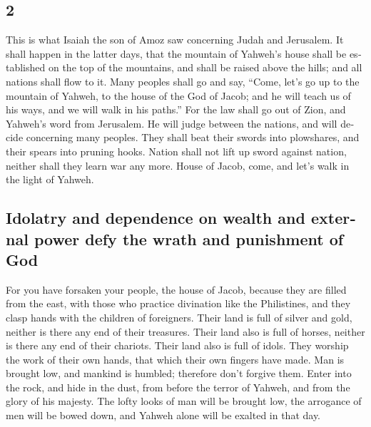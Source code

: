 \begin{paracol}{2}
\begin{otherlanguage}{english}
\hypertarget{section-3}{%
\section{2}\label{section-3}}

 This is what Isaiah the son of Amoz saw concerning Judah
and Jerusalem.  It shall happen in the latter days, that
the mountain of Yahweh's house shall be established on the top of the
mountains, and shall be raised above the hills; and all nations shall
flow to it.  Many peoples shall go and say, ``Come, let's
go up to the mountain of Yahweh, to the house of the God of Jacob; and
he will teach us of his ways, and we will walk in his paths.'' For the
law shall go out of Zion, and Yahweh's word from Jerusalem.
 He will judge between the nations, and will decide
concerning many peoples. They shall beat their swords into plowshares,
and their spears into pruning hooks. Nation shall not lift up sword
against nation, neither shall they learn war any more. 
House of Jacob, come, and let's walk in the light of Yahweh.

\hypertarget{idolatry-and-dependence-on-wealth-and-external-power-defy-the-wrath-and-punishment-of-god}{%
\subsection{Idolatry and dependence on wealth and external power defy
the wrath and punishment of
God}\label{idolatry-and-dependence-on-wealth-and-external-power-defy-the-wrath-and-punishment-of-god}}

 For you have forsaken your people, the house of Jacob,
because they are filled from the east, with those who practice
divination like the Philistines, and they clasp hands with the children
of foreigners.  Their land is full of silver and gold,
neither is there any end of their treasures. Their land also is full of
horses, neither is there any end of their chariots.  Their
land also is full of idols. They worship the work of their own hands,
that which their own fingers have made.  Man is brought
low, and mankind is humbled; therefore don't forgive them.
 Enter into the rock, and hide in the dust, from before
the terror of Yahweh, and from the glory of his majesty. 
The lofty looks of man will be brought low, the arrogance of men will be
bowed down, and Yahweh alone will be exalted in that day.


\end{otherlanguage}
\end{paracol}
